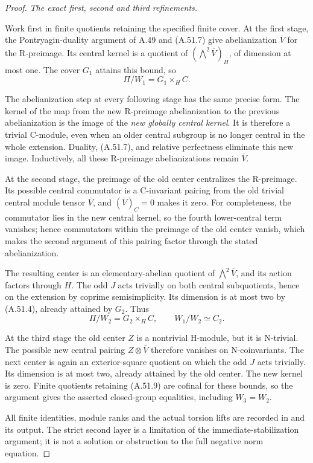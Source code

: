 \begin{proof}
\emph{The exact first, second and third refinements.}\par
Work first in finite quotients retaining the
specified finite cover. At the first stage,
the Pontryagin-duality argument of A.49 and
(A.51.7) give abelianization \(\overline V\)
for the R-preimage. Its central kernel is a
quotient of
\((\bigwedge^2\overline V)_H\), of dimension
at most one. The cover \(G_1\) attains this bound,
so
\[
                     \Pi/W_1=G_1\times_H C.
                                                               \tag{A.51.10}
\]

The abelianization step at every following stage
has the same precise form. The kernel of the map
from the new R-preimage abelianization to the
previous abelianization is the image of the
\emph{new globally central kernel}. It is
therefore a trivial C-module, even when an older
central subgroup is no longer central in the
whole extension. Duality, (A.51.7), and relative
perfectness eliminate this new image. Inductively,
all these R-preimage abelianizations remain
\(\overline V\).

At the second stage, the preimage of the old
center centralizes the R-preimage. Its possible
central commutator is a C-invariant pairing from
the old trivial central module tensor
\(\overline V\), and
\((\overline V)_C=0\) makes it zero.
For completeness, the commutator lies in the
new central kernel, so the fourth lower-central
term vanishes; hence commutators within the
preimage of the old center vanish, which makes
the second argument of this pairing factor
through the stated abelianization.

The resulting center is an elementary-abelian
quotient of \(\bigwedge^2\overline V\), and its
action factors through \(H\). The odd \(J\)
acts trivially on both central subquotients, hence
on the extension by coprime semisimplicity.
Its dimension is at most two by (A.51.4),
already attained by \(G_2\). Thus
\[
              \Pi/W_2=G_2\times_H C,
              \qquad W_1/W_2\simeq C_2.
                                                               \tag{A.51.11}
\]

At the third stage the old center \(Z\) is a
nontrivial H-module, but it is N-trivial.
The possible new central pairing
\(Z\otimes\overline V\) therefore vanishes
on N-coinvariants. The next center is again
an exterior-square quotient on which the odd
\(J\) acts trivially. Its dimension is at most
two, already attained by the old center.
The new kernel is zero. Finite quotients
retaining (A.51.9) are cofinal for these bounds,
so the argument gives the asserted closed-group
equalities, including \(W_3=W_2\).

All finite identities, module ranks and the
actual torsion lifts are recorded in
 and its output.
The strict second layer is a limitation of the
immediate-stabilization argument; it is not a
solution or obstruction to the full negative
norm equation.
\end{proof}


